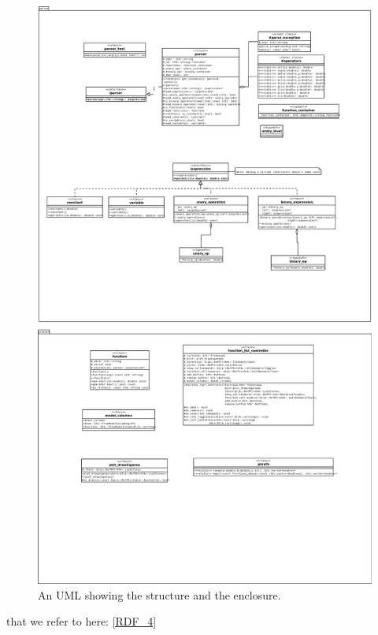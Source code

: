 \documentclass[a4paper,11pt]{kth-mag}
\begin{document}
\begin{figure}[ht]
    \begin{center}
        \includegraphics{uml.png}
        \caption{\small{An UML showing the structure and the enclosure.}}\label{fig:UML}
    \end{center}
\end{figure}

that we refer to here: \ref{RDF_4}
\end{document}
